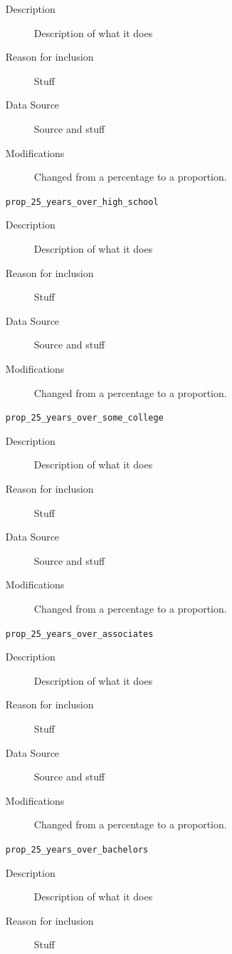 \documentclass{article}
\begin{document}
\begin{itemize}[label={}, align=left]
	      \begin{description}
		      \item[Description] Description of what it does
		      \item[Reason for inclusion] Stuff
		      \item[Data Source] Source and stuff
		      \item[Modifications] Changed from a percentage to a proportion.
	      \end{description}
	\item[\texttt{prop\_25\_years\_over\_high\_school}] \
	      \begin{description}
		      \item[Description] Description of what it does
		      \item[Reason for inclusion] Stuff
		      \item[Data Source] Source and stuff
		      \item[Modifications] Changed from a percentage to a proportion.
	      \end{description}
	\item[\texttt{prop\_25\_years\_over\_some\_college}] \
	      \begin{description}
		      \item[Description] Description of what it does
		      \item[Reason for inclusion] Stuff
		      \item[Data Source] Source and stuff
		      \item[Modifications] Changed from a percentage to a proportion.
	      \end{description}
	\item[\texttt{prop\_25\_years\_over\_associates}] \
	      \begin{description}
		      \item[Description] Description of what it does
		      \item[Reason for inclusion] Stuff
		      \item[Data Source] Source and stuff
		      \item[Modifications] Changed from a percentage to a proportion.
	      \end{description}
	\item[\texttt{prop\_25\_years\_over\_bachelors}] \
	      \begin{description}
		      \item[Description] Description of what it does
		      \item[Reason for inclusion] Stuff

\end{description}
\end{itemize}
\end{document}
